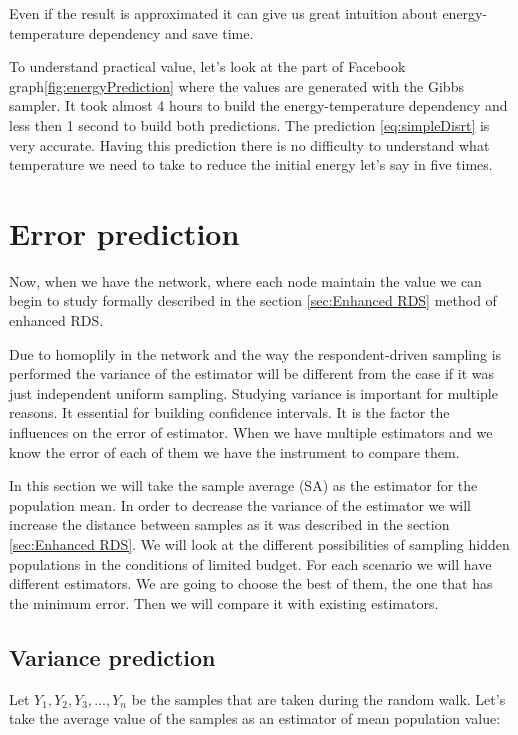 \documentclass[12pt]{report}
\begin{document}
Even if the result is approximated it can give us great intuition about energy-temperature dependency and save time.

To understand practical value, let's look at the part of Facebook graph\ref{fig:energyPrediction} where the values are generated with the Gibbs sampler. It took almost 4 hours to build the energy-temperature dependency and less then 1 second to build both predictions. The prediction \ref{eq:simpleDisrt} is very accurate. Having this prediction there is no difficulty to understand what temperature we need to take to reduce the initial energy let's say in five times.

\section{Error prediction}

Now, when we have the network, where each node maintain the value we can begin to study formally described in the section 
\ref{sec:Enhanced RDS} method of enhanced RDS.

Due to homoplily in the network and the way the respondent-driven sampling is performed the variance of the estimator will be different from the case if it was just independent uniform sampling. Studying variance is important for multiple reasons. It essential for building confidence intervals. It is the factor the influences on the error of estimator. When we have multiple estimators and we know the error of each of them we have the instrument to compare them.


In this section we will take the sample average (SA) as the estimator for the population mean. In order to decrease the variance of the estimator we will increase the distance between samples as it was described in the section \ref{sec:Enhanced RDS}. We will look at the different possibilities of sampling hidden populations in the conditions of limited budget. For each scenario we will have different estimators. We are going to choose the best of them, the one that has the minimum error. Then we will compare it with existing estimators.

\subsection{Variance prediction}

Let $Y_1, Y_2, Y_3,..., Y_n$ be the samples that are taken during the random walk. Let's take the average value of the samples as an estimator of mean population value:
\end{document}

